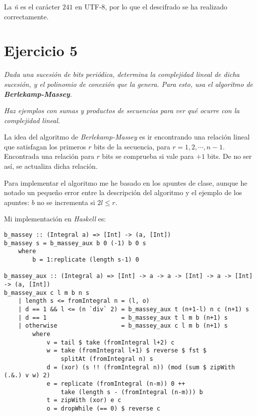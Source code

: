 \documentclass[10pt,spanish]{article}
\begin{document}
La \textit{ñ} es el carácter $241$ en UTF-8, por lo que el descifrado se ha realizado correctamente.

\section{\textcolor{azul}Ejercicio 5}
\textit{Dada una sucesión de bits periódica, determina la complejidad lineal de dicha sucesión, y el polinomio de conexión que la genera. Para esto, usa el algoritmo de \textbf{\textcolor{azul}{Berlekamp-Massey}}.}

\textit{Haz ejemplos con sumas y productos de secuencias para ver qué ocurre con la complejidad lineal.}

La idea del algoritmo de \textit{\textcolor{azul}{Berlekamp-Massey}} es ir encontrando una relación lineal que satisfagan los primeros $r$ bits de la secuencia, para $r = 1,2,\cdots,n-1$. Encontrada una relación para $r$ bits se comprueba si vale para $+1$ bits. De no ser así, se actualiza dicha relación.

Para implementar el algoritmo me he basado en los apuntes de clase, aunque he notado un pequeño error entre la descripción del algoritmo y el ejemplo de los apuntes: $b$ no se incrementa si $2l \leq r$. 

Mi implementación en \textit{\textcolor{azul}{Haskell}} es:

\begin{verbatim}
b_massey :: (Integral a) => [Int] -> (a, [Int])
b_massey s = b_massey_aux b 0 (-1) b 0 s
    where
        b = 1:replicate (length s-1) 0

b_massey_aux :: (Integral a) => [Int] -> a -> a -> [Int] -> a -> [Int] -> (a, [Int])
b_massey_aux c l m b n s
    | length s <= fromIntegral n = (l, o)
    | d == 1 && l <= (n `div` 2) = b_massey_aux t (n+1-l) n c (n+1) s
    | d == 1                     = b_massey_aux t l m b (n+1) s
    | otherwise                  = b_massey_aux c l m b (n+1) s
        where
            v = tail $ take (fromIntegral l+2) c 
            w = take (fromIntegral l+1) $ reverse $ fst $ 
                splitAt (fromIntegral n) s
            d = (xor) (s !! (fromIntegral n)) (mod (sum $ zipWith (.&.) v w) 2)
            e = replicate (fromIntegral (n-m)) 0 ++ 
                take (length s - (fromIntegral (n-m))) b
            t = zipWith (xor) e c
            o = dropWhile (== 0) $ reverse c

\end{verbatim}
\end{document}
